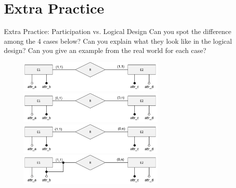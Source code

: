 \section*{Extra Practice}
\begin{frame}[fragile]{Extra Practice: Participation vs. Logical Design}
Can you spot the difference among the 4 cases below? Can you explain what they look like in the logical design? Can you give an example from the real world for each case?\\ \vspace{4pt}
	
\begin{figure}
	\includegraphics[width=0.65\textwidth, trim=0 0 0 0, clip]{t4/images/case1.png}
	\includegraphics[width=0.65\textwidth, trim=0 0 0 0, clip]{t4/images/case2.png}
	\includegraphics[width=0.65\textwidth, trim=0 0 0 0, clip]{t4/images/case3.png}
	\includegraphics[width=0.65\textwidth, trim=0 0 0 0, clip]{t4/images/case4.png}
\end{figure}
\end{frame}

